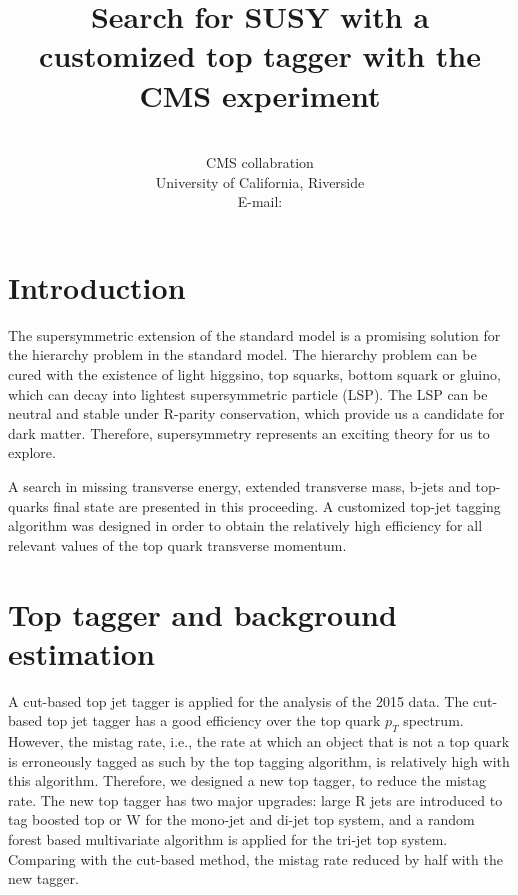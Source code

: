 \documentclass{PoS}
\title{Search for SUSY with a customized top tagger with the CMS experiment}
\author
{
  \speaker{Hua Wei}\\
  CMS collabration\\
  University of California, Riverside\\
  E-mail: \email{hua.wei@cern.ch}
}
\begin{document}
\section{Introduction}

The supersymmetric extension of the standard model is a promising solution for the hierarchy problem in the standard model. The hierarchy problem can be cured with the existence of light higgsino, top squarks, bottom squark or gluino, which can decay into lightest supersymmetric particle (LSP). The LSP can be neutral and stable under R-parity conservation, which provide us a candidate for dark matter. Therefore, supersymmetry represents an exciting theory for us to explore.

A search in missing transverse energy, extended transverse mass, b-jets and top-quarks final state are presented in this proceeding. A customized top-jet tagging algorithm was designed in order to obtain the relatively high efficiency for all relevant values of the top quark transverse momentum.

\section{Top tagger and background estimation}

A cut-based top jet tagger is applied for the analysis of the 2015 data\cite{PhysRevD.96.012004}. The cut-based top jet tagger has a good efficiency over the top quark $p_{T}$ spectrum. However, the mistag rate, i.e., the rate at which an object that is not a top quark is erroneously tagged as such by the top tagging algorithm, is relatively high with this algorithm. Therefore, we designed a new top tagger, to reduce the mistag rate. The new top tagger\cite{AN-16-461} has two major upgrades: large R jets are introduced to tag boosted top or W for the mono-jet and di-jet top system, and a random forest\cite{Ho:1995:RDF:844379.844681} based multivariate algorithm is applied for the tri-jet top system. Comparing with the cut-based method, the mistag rate reduced by half with the new tagger.
\end{document}
